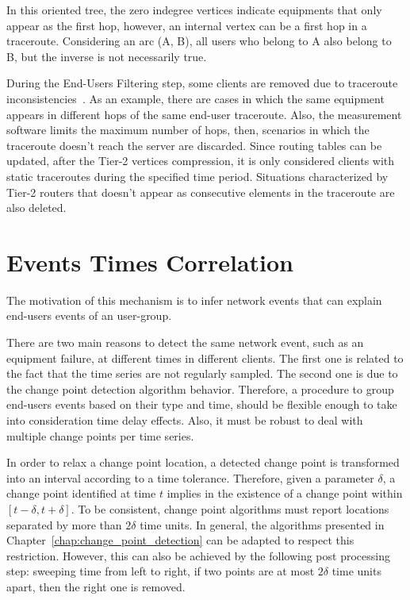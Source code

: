 In this oriented tree, the zero
indegree vertices indicate equipments that only appear as the first hop,
however, an internal vertex can be a first hop in a traceroute.
Considering an arc (A, B), all users who belong to A also belong to B,
but the inverse is not necessarily true.

During the End-Users Filtering step, some clients are removed due to traceroute
inconsistencies~\cite{avoiding_traceroute_anomalies_with_paris_traceroute}.
As an example, there are cases in which the same equipment appears in different
hops of the same end-user traceroute. Also,
the measurement software limits the maximum number of hops, then,
scenarios in which the traceroute doesn't reach the server are discarded.
Since routing tables can be updated, after the Tier-2 vertices compression,
it is only considered clients with static traceroutes
during the specified time period.
Situations characterized by Tier-2 routers that doesn't appear as consecutive
elements in the traceroute are also deleted.

\section{Events Times Correlation}
\label{sec:events_times_correlation}

The motivation of this mechanism is to infer network events that can explain
end-users events of an user-group.

There are two main reasons to detect the same network event, such as an
equipment failure, at different times in different clients. The first one is
related to the fact that the time series are not regularly sampled. The second
one is due to the change point detection algorithm behavior.
Therefore, a procedure to group end-users events based on their type and time,
should be flexible enough to take into consideration time delay effects. Also,
it must be robust to deal with multiple change points per time series.

In order to relax a change point location, a detected change point is
transformed into an interval according to a time tolerance.
Therefore, given a parameter $\delta$, a change point identified at
time $t$ implies in the existence of a change point within
$[t - \delta, t + \delta]$. To be consistent,
change point algorithms must report locations separated by more than
$2 \delta$ time units. In general, the algorithms presented in
Chapter~\ref{chap:change_point_detection}
can be adapted to respect this restriction. However, this can also be
achieved by the following post processing step:
sweeping time from left to right, if two
points are at most $2 \delta$ time units apart, then the right one is removed.

